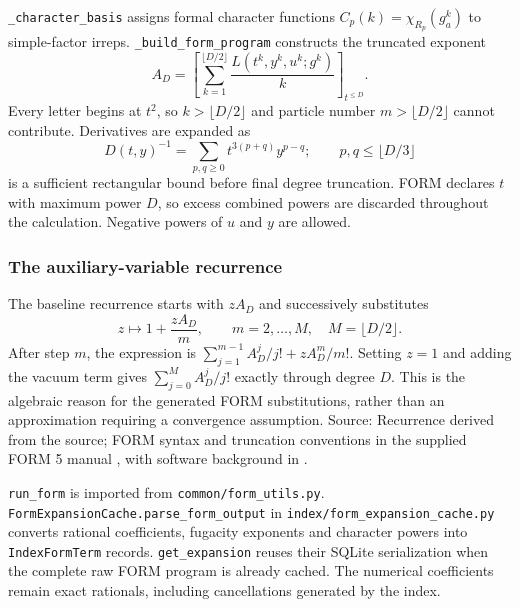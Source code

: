 \documentclass[11pt,a4paper]{article}
\numberwithin{equation}{section}
\newcommand{\code}[1]{{\small\nolinkurl{#1}}}
\newcommand{\src}[1]{{\small\color{muted}Source: #1.}\par}
\begin{document}
\code{_character_basis} assigns formal character functions
$C_p(k)=\chi_{R_p}(g_a^k)$ to simple-factor irreps.
\code{_build_form_program} constructs the truncated exponent
\begin{equation}
 A_D=\left[\sum_{k=1}^{\lfloor D/2\rfloor}\frac{L(t^k,y^k,u^k;g^k)}k
 \right]_{t^{\leq D}}.
 \label{eq:trunc-exponent}
\end{equation}
Every letter begins at $t^2$, so $k>\lfloor D/2\rfloor$ and particle number
$m>\lfloor D/2\rfloor$ cannot contribute. Derivatives are expanded as
\begin{equation}
 D(t,y)^{-1}=\sum_{p,q\geq0}t^{3(p+q)}y^{p-q};
 \qquad p,q\leq\lfloor D/3\rfloor
 \label{eq:derivatives}
\end{equation}
is a sufficient rectangular bound before final degree truncation. FORM declares
$t$ with maximum power $D$, so excess combined powers are discarded throughout
the calculation. Negative powers of $u$ and $y$ are allowed.

\subsubsection{The auxiliary-variable recurrence}
The baseline recurrence starts with $zA_D$ and successively substitutes
\begin{equation}
 z\longmapsto1+\frac{zA_D}{m},\qquad m=2,\ldots,M,
 \quad M=\lfloor D/2\rfloor.
 \label{eq:exp-recursion}
\end{equation}
After step $m$, the expression is
$\sum_{j=1}^{m-1}A_D^j/j!+zA_D^m/m!$. Setting $z=1$ and adding the vacuum
term gives $\sum_{j=0}^{M}A_D^j/j!$ exactly through degree $D$.
This is the algebraic reason for the generated FORM substitutions, rather than
an approximation requiring a convergence assumption.
\src{Recurrence derived from the source; FORM syntax and truncation conventions
in the supplied FORM 5 manual \cite{form5}, with software background in \cite{form4}}

\code{run_form} is imported from \code{common/form_utils.py}.
\code{FormExpansionCache.parse_form_output} in \code{index/form_expansion_cache.py}
converts rational coefficients, fugacity exponents and character powers into
\code{IndexFormTerm} records. \code{get_expansion} reuses their SQLite serialization
when the complete raw FORM program is already cached. The numerical coefficients remain
exact rationals, including cancellations generated by the index.

\newcommand{\sessionheading}{\subsubsection}
\clearpage


\end{document}
